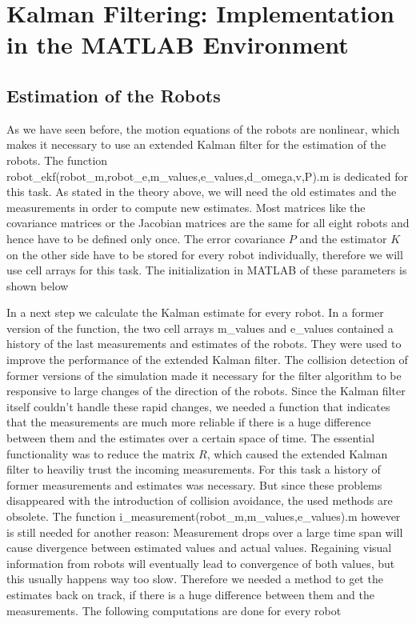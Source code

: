
\chapter{Kalman Filtering: Implementation in the MATLAB Environment}

\section{Estimation of the Robots}

As we have seen before, the motion equations of the robots are nonlinear, which makes it necessary to use an extended Kalman filter for the estimation of the robots. The function {\selectfont robot\_ekf(robot\_m,robot\_e,m\_values,e\_values,d\_omega,v,P).m} is dedicated for this task. As stated in the theory above, we will need the old estimates and the measurements in order to compute new estimates. Most matrices like the covariance matrices or the Jacobian matrices are the same for all eight robots and hence have to be defined only once. The error covariance \(P\) and the estimator \(K\) on the other side have to be stored for every robot individually, therefore we will use cell arrays for this task. The initialization in MATLAB of these parameters is shown below


\parskip 20pt

In a next step we calculate the Kalman estimate for every robot. In a former version of the function, the two cell arrays {\selectfont m\_values} and {\selectfont e\_values} contained a history of the last measurements and estimates of the robots. They were used to improve the performance of the extended Kalman filter. The collision detection of former versions of the simulation made it necessary for the filter algorithm to be responsive to large changes of the direction of the robots. Since the Kalman filter itself couldn't handle these rapid changes, we needed a function that indicates that the measurements are much more reliable if there is a huge difference between them and the estimates over a certain space of time. The essential functionality was  to reduce the matrix \(R\), which caused the extended Kalman filter to heaviliy trust the incoming measurements. For this task a history of former measurements and estimates was necessary. But since these problems disappeared with the introduction of collision avoidance, the used methods are obsolete. The function {\selectfont i\_measurement(robot\_m,m\_values,e\_values).m} however is still needed for another reason: Measurement drops over a large time span will cause divergence between estimated values and actual values. Regaining visual information from robots will eventually lead to convergence of both values, but this usually happens way too slow. Therefore we needed a method to get the estimates back on track, if there is a huge difference between them and the measurements. The following computations are done for every robot

